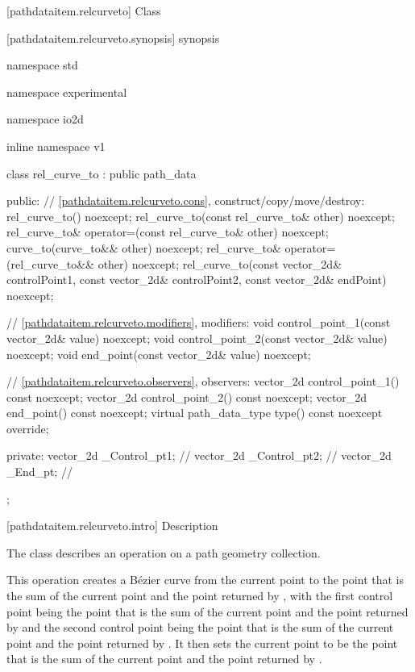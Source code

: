  [pathdataitem.relcurveto] {Class }

 [pathdataitem.relcurveto.synopsis] { synopsis}

\begin{codeblock}
namespace std { namespace experimental { namespace io2d { inline namespace v1 {
  class rel_curve_to : public path_data {
  public:
    // \ref{pathdataitem.relcurveto.cons}, construct/copy/move/destroy:
    rel_curve_to() noexcept;
    rel_curve_to(const rel_curve_to& other) noexcept;
    rel_curve_to& operator=(const rel_curve_to& other) noexcept;
    curve_to(curve_to&& other) noexcept;
    rel_curve_to& operator=(rel_curve_to&& other) noexcept;
    rel_curve_to(const vector_2d& controlPoint1, const vector_2d& controlPoint2,
      const vector_2d& endPoint) noexcept;

    // \ref{pathdataitem.relcurveto.modifiers}, modifiers:
    void control_point_1(const vector_2d& value) noexcept;
    void control_point_2(const vector_2d& value) noexcept;
    void end_point(const vector_2d& value) noexcept;


    // \ref{pathdataitem.relcurveto.observers}, observers:
    vector_2d control_point_1() const noexcept;
    vector_2d control_point_2() const noexcept;
    vector_2d end_point() const noexcept;
    virtual path_data_type type() const noexcept override;
    
  private:
    vector_2d _Control_pt1; // \expos
    vector_2d _Control_pt2; // \expos
    vector_2d _End_pt;      // \expos
  };
} } } }
\end{codeblock}

 [pathdataitem.relcurveto.intro] { Description}

\pnum
{}
The class  describes an operation on a path geometry collection.

\pnum
This operation creates a B\'ezier curve from the current point to the point that is the sum of the current point and the point returned by , with the first control point being the point that is the sum of the current point and the point returned by  and the second control point being the point that is the sum of the current point and the point returned by . It then sets the current point to be the point that is the sum of the current point and the point returned by .

